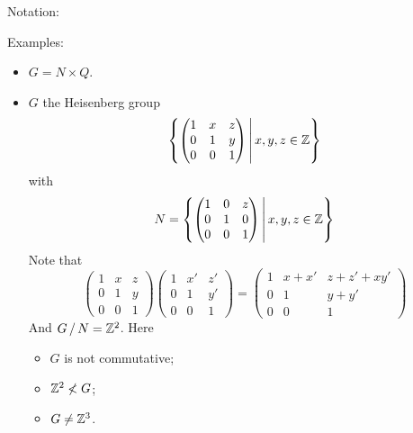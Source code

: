     Notation:

    Examples:
    \begin{itemize}
        \item $G = N \times Q$.
        \item $G$ the Heisenberg group
            \[
                \left\{ 
                    \begin{pmatrix}
                        1 & x & z \\
                        0 & 1 & y \\
                        0 & 0 & 1
                    \end{pmatrix}
                 \, \middle| \, 
                    x, y, z \in \mathbb Z
                 \right\}
            \]
            with \[
                N = \left\{ 
                    \begin{pmatrix}
                        1 & 0 & z \\
                        0 & 1 & 0 \\
                        0 & 0 & 1
                    \end{pmatrix}
                 \, \middle| \, 
                    x, y, z \in \mathbb Z
                 \right\}
            \]
            Note that \[
                \begin{pmatrix}
                    1 & x & z \\
                    0 & 1 & y \\
                    0 & 0 & 1
                \end{pmatrix}
                \begin{pmatrix}
                    1 & x' & z' \\
                    0 & 1 & y' \\
                    0 & 0 & 1
                \end{pmatrix}
                = 
                \begin{pmatrix}
                    1 & x+x' & z+z' + xy' \\
                    0 & 1 & y+y' \\
                    0 & 0 & 1
                \end{pmatrix}
            \]
            And $\quotient{G}{N} = \Z^2$.
            Here \begin{itemize}
                \item $G$ is not commutative;
                \item $\mathbb Z^2 \not< G$;
                \item $G \neq \mathbb Z^3$.
            \end{itemize}
    \end{itemize}

